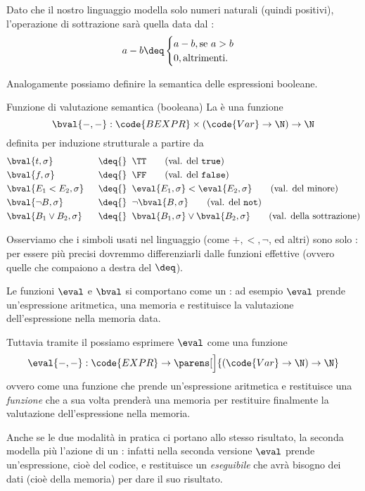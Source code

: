 Dato che il nostro linguaggio modella solo numeri naturali (quindi positivi), l'operazione di sottrazione sarà quella data dal : \[
    a - b \deq \begin{cases}
        a - b, \text{se } a > b\\
        0, \text{altrimenti.}
    \end{cases}
\]

Analogamente possiamo definire la semantica delle espressioni booleane.

\begin{definition}
    {Funzione di valutazione semantica (booleana)}{}
    La  è una funzione \[
        \bval{\blank, \blank} : \code{BEXPR} \times (\code{Var} \to \N) \to \N
    \] definita per induzione strutturale a partire da
    \begin{alignat*}{2}
        &\bval{t, \sigma} &&\;\;\deq{}\;\; \TT \tag{val. del \texttt{true}}\\
        &\bval{f, \sigma} &&\;\;\deq{}\;\; \FF \tag{val. del \texttt{false}}\\
        &\bval{E_1 < E_2, \sigma} &&\;\;\deq{}\;\; \eval{E_1, \sigma} < \eval{E_2, \sigma} \tag{val. del minore}\\
        &\bval{\neg B, \sigma} &&\;\;\deq{}\;\; \neg \bval{B, \sigma}  \tag{val. del \texttt{not}}\\
        &\bval{B_1 \lor B_2, \sigma} &&\;\;\deq{}\;\; \bval{B_1, \sigma} \lor \bval{B_2, \sigma} \tag{val. della sottrazione}
    \end{alignat*}
\end{definition}

Osserviamo che i simboli usati nel linguaggio (come $+, <, \neg$, ed altri) sono solo : per essere più precisi dovremmo differenziarli dalle funzioni effettive (ovvero quelle che compaiono a destra del $\deq$).

\begin{remark}
    Le funzioni $\eval$ e $\bval$ si comportano come un : ad esempio $\eval$ prende un'espressione aritmetica, una memoria e restituisce la valutazione dell'espressione nella memoria data.

    Tuttavia tramite il  possiamo esprimere $\eval$ come una funzione \[
        \eval{\blank, \blank} : \code{EXPR} \to \parens[\Big]{(\code{Var} \to \N) \to \N}
    \] ovvero come una funzione che prende un'espressione aritmetica e restituisce una \emph{funzione} che a sua volta prenderà una memoria per restituire finalmente la valutazione dell'espressione nella memoria.

    Anche se le due modalità in pratica ci portano allo stesso risultato, la seconda modella più l'azione di un : infatti nella seconda versione $\eval$ prende un'espressione, cioè del codice, e restituisce un \emph{eseguibile} che avrà bisogno dei dati (cioè della memoria) per dare il suo risultato. 
\end{remark}

